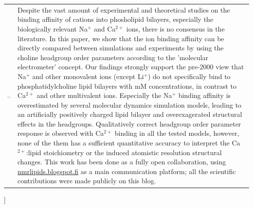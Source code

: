 \documentclass[twoside,twocolumn,9pt]{article}
\begin{document}
\begin{@twocolumnfalse}
\begin{tabular}{m{4.5cm} p{13.5cm} }
\includegraphics{head_foot/dates} & \noindent\normalsize{
Despite the vast amount of experimental and theoretical studies on the binding affinity of cations into phosholipid bilayers, 
especially the biologically relevant Na$^+$ and Ca$^{2+}$ ions,  there is no consensus in the literature. 
In this paper, we show that the ion binding affinity can be directly compared between simulations and experiments by 
using the choline headgroup order parameters according to the 'molecular electrometer' concept.%
Our findings strongly support the pre-2000 view that Na$^+$ and other monovalent ions
(except Li$^+$) do not specifically bind to phosphatidylcholine lipid bilayers with mM concentrations, 
in contrast to Ca$^{2+}$ and other multivalent ions. Especially the Na$^+$ binding affinity is 
overestimated by several molecular dynamics simulation models, leading to 
an artificially positively charged lipid bilayer and overexagerated structural effects in the headgroups. 
Qualitatively correct headgroup order parameter response is observed with
Ca$^{2+}$ binding in all the tested models, however, none of the them has a sufficient 
quantitative accuracy to interpret the Ca$^{2+}$:lipid stoichiometry or the induced atomistic resolution structural changes.
This work has been done as a fully open collaboration, using \url{nmrlipids.blogspot.fi} as a main communication platform; 
all the scientific contributions were made publicly on this blog. } \\%

\end{tabular}

 \end{@twocolumnfalse} \vspace{0.6cm}

  ]

\renewcommand*\rmdefault{bch}\normalfont\upshape
\rmfamily
\end{document}
